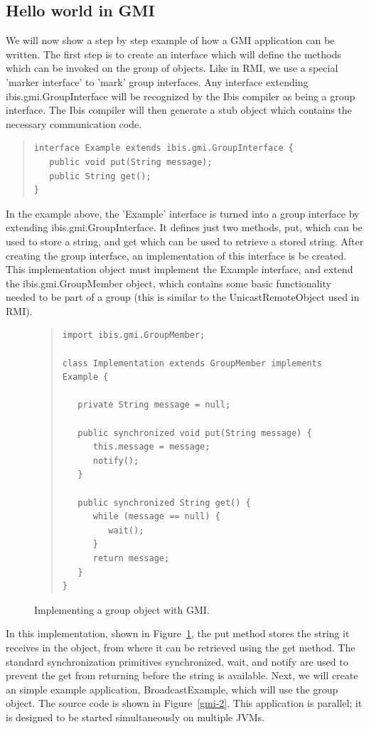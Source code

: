 \documentclass[10pt]{article}
\newcommand{\mysubsection}[1]{\subsection{#1}\label{#1}}
\begin{document}
\mysubsection{Hello world in GMI}

 We will now show a
step by step example of how a GMI application can be written. The
first step is to create an interface which will define the methods
which can be invoked on the group of objects. Like in RMI, we use a
special 'marker interface' to 'mark' group interfaces. Any interface
extending ibis.gmi.GroupInterface will be recognized by the Ibis
compiler as being a group interface. The Ibis compiler will then
generate a stub object which contains the necessary communication
code.

\begin{quote}
\begin{verbatim}
interface Example extends ibis.gmi.GroupInterface {
   public void put(String message);
   public String get();
}
\end{verbatim}
\end{quote}
\noindent

In the example above, the 'Example' interface is turned into a group
interface by extending ibis.gmi.GroupInterface. It defines just two
methods, put, which can be used to store a string, and get which can
be used to retrieve a stored string.  After creating the group
interface, an implementation of this interface is be created. This
implementation object must implement the Example interface, and extend
the ibis.gmi.GroupMember object, which contains some basic
functionality needed to be part of a group (this is similar to the
UnicastRemoteObject used in RMI).

\begin{figure}[t!]
\small{
\begin{quote}
\begin{verbatim}
import ibis.gmi.GroupMember;

class Implementation extends GroupMember implements Example {

   private String message = null;

   public synchronized void put(String message) {
      this.message = message;
      notify();
   }
   
   public synchronized String get() { 
      while (message == null) { 
         wait();
      }       
      return message;
   } 
}
\end{verbatim}
\end{quote}
}
\caption{Implementing a group object with GMI.}
\label{gmi-1}
\end{figure}

In this implementation, shown in Figure~\ref{gmi-1}, the put method stores the
string it receives in the object, from where it can be retrieved using
the get method. The standard synchronization primitives synchronized,
wait, and notify are used to prevent the get from returning before the
string is available.  Next, we will create an simple example
application, BroadcastExample, which will use the group object. The
source code is shown in Figure~\ref{gmi-2}. This application is parallel; it is
designed to be started simultaneously on multiple JVMs.
\end{document}
